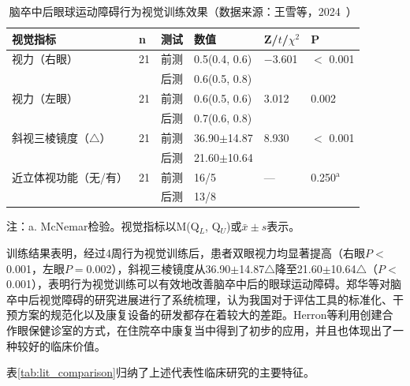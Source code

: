 \begin{table}[h!]
\centering
\small
\caption{脑卒中后眼球运动障碍行为视觉训练效果（数据来源：王雪等，2024~\cite{sun2024pursuit}）}
\label{tab:wangxue_table1}
\begin{tabular}{p{3.2cm} p{1.2cm} p{1.1cm} p{3.0cm} p{2.0cm} p{1.5cm}}
\toprule[1.5pt]
\textbf{视觉指标} & \textbf{n} & \textbf{测试} & \textbf{数值} & \textbf{Z/$t$/$\chi^2$} & \textbf{P} \\
\midrule[1pt]
视力（右眼） & 21 & 前测 & 0.5(0.4, 0.6)  & $-$3.601 & $<$ 0.001 \\
             &    & 后测 & 0.6(0.5, 0.8)  &           &          \\
视力（左眼） & 21 & 前测 & 0.6(0.5, 0.6)  & 3.012    & 0.002    \\
             &    & 后测 & 0.7(0.6, 0.8)  &           &          \\
斜视三棱镜度（$\triangle$） & 21 & 前测 & 36.90$\pm$14.87 & 8.930  & $<$ 0.001 \\
             &    & 后测 & 21.60$\pm$10.64 &           &          \\
近立体视功能（无/有） & 21 & 前测 & 16/5  & —   & 0.250$^{\mathrm{a}}$  \\
             &    & 后测 & 13/8  &      &          \\
\bottomrule[1.5pt]
\end{tabular}

\vspace{0.5em}

{\small 注：a. McNemar检验。视觉指标以M(Q$_L$, Q$_U$)或$\bar x\pm s$表示。}
\end{table}

训练结果表明，经过4周行为视觉训练后，患者双眼视力均显著提高（右眼$P<$0.001，左眼$P=$0.002），斜视三棱镜度从36.90$\pm$14.87$\triangle$降至21.60$\pm$10.64$\triangle$（$P<$0.001），表明行为视觉训练可以有效地改善脑卒中后的眼球运动障碍。郑华等对脑卒中后视觉障碍的研究进展进行了系统梳理\cite{zheng2025stroke}，认为我国对于评估工具的标准化、干预方案的规范化以及康复设备的研发都存在着较大的差距。Herron等利用创建合作眼保健诊室的方式\cite{herron2015review}，在住院卒中康复当中得到了初步的应用，并且也体现出了一种较好的临床价值。

表\ref{tab:lit_comparison}归纳了上述代表性临床研究的主要特征。

